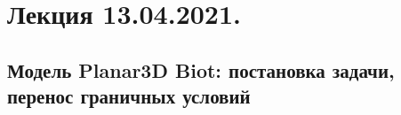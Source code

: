 \documentclass[main.tex]{subfiles}
\begin{document}

\section{Лекция 13.04.2021.}

\subsection{Модель Planar3D Biot: постановка задачи, перенос граничных условий}
\end{document}

